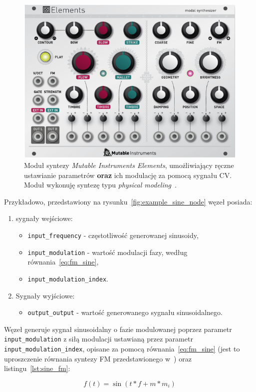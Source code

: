 \begin{figure}[H]\label{fig:example_eurorack_module}
    \centering
    \includegraphics[width=0.45\linewidth]{rys05/mutable_instruments_elements.png}
    \caption{
      Moduł syntezy \textit{Mutable Instruments Elements}, umożliwiający ręczne ustawianie parametrów \textbf{oraz} ich modulację
      za pomocą sygnału CV\@. Moduł wykonuję syntezę typu \textit{physical modeling}~\cite{lisp_synthesis}.
    }
\end{figure}

\noindent
Przykładowo, przedstawiony na rysunku~\ref{fig:example_sine_node} węzeł posiada:
\begin{enumerate}
  \item sygnały wejściowe:
  \begin{itemize}
    \item \texttt{input\_frequency} - częstotliwość generowanej sinusoidy,
    \item \texttt{input\_modulation} - wartość modulacji fazy, według równania~\ref{eq:fm_sine},
    \item \texttt{input\_modulation\_index}.
  \end{itemize}
  \item Sygnały wyjściowe:
  \begin{itemize}
    \item \texttt{output\_output} - wartość generowanego sygnału sinusoidalnego.
  \end{itemize}
\end{enumerate}

\noindent
Węzeł generuje sygnał sinusoidalny o fazie modulowanej poprzez parametr \texttt{input\_modulation} z siłą modulacji ustawianą przez
parametr \texttt{input\_modulation\_index}, opisane za pomocą równania~\ref{eq:fm_sine}
(jest to uproszczenie równania syntezy FM przedstawionego w~\cite{spectral_audio_processing}) oraz listingu~\ref{lst:sine_fm}:

\begin{equation} \label{eq:fm_sine}
  f(t) = \sin(t * f + m * m_i)
\end{equation}

